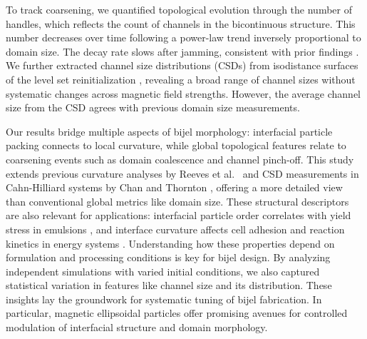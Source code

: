 To track coarsening, we quantified topological evolution through the number of handles, which reflects the count of channels in the bicontinuous structure. This number decreases over time following a 
power-law trend inversely proportional to domain size. The decay rate slows after jamming, consistent with prior findings \cite{gunther_timescales_2014, karthikeyan_formation_2024}. We further 
extracted channel size distributions (CSDs) from isodistance surfaces of the level set reinitialization \cite{chan_channel_2012}, revealing a broad range of channel sizes without systematic 
changes across magnetic field strengths. However, the average channel size from the CSD agrees with previous domain size measurements.

Our results bridge multiple aspects of bijel morphology: interfacial particle packing connects to local curvature, while global topological features relate to coarsening events such as domain 
coalescence and channel pinch-off. This study extends previous curvature analyses by Reeves et al.~\cite{reeves_quantitative_2016} and CSD measurements in Cahn-Hilliard systems by Chan and 
Thornton \cite{chan_channel_2012}, offering a more detailed view than conventional global metrics like domain size. These structural descriptors are also relevant for applications: interfacial 
particle order correlates with yield stress in emulsions \cite{besseling_three-dimensional_2007, schall_structural_2007, madivala_exploiting_2009, vagberg_glassiness_2011, kaganyuk_shear-induced_2020}, 
and interface curvature affects cell adhesion and reaction kinetics in energy systems \cite{xiong_porosity_2024, shojaei_minimal_2022}.
Understanding how these properties depend on formulation and processing conditions is key for bijel design. By analyzing independent simulations with varied initial conditions, we also captured 
statistical variation in features like channel size and its distribution. These insights lay the groundwork for systematic tuning of bijel fabrication. In particular, magnetic ellipsoidal particles 
offer promising avenues for controlled modulation of interfacial structure and domain morphology.